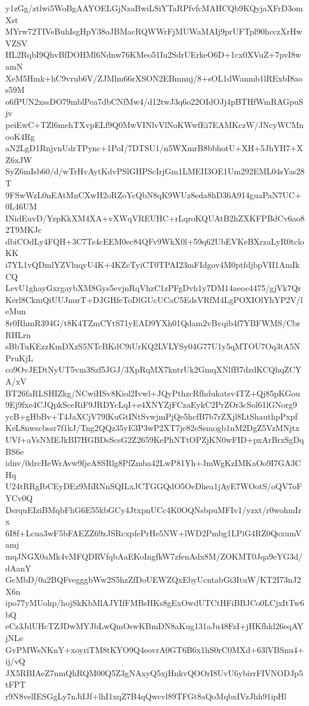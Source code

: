 y1zGg/ztlwi5WoBgAAYOELGjNzaBwiLSiYTaRPfvfcMAHCQb9KQyjaXFrD3omXst
MYrw72TIVeBuhIsgHpY38oJBMacRQWWrFjMUWaMAIj9prUFTpl90hcczXrHwVZSV
HL2RqbI9QhvBfDOHMl6Ndnw76KMeo51Iu2SdrUErkeO6D+1cx0XVuZ+7pvI8wamN
XeM5Hmk+hC9vrub6V/ZJMlm66rXSON2EBmnnj/8+sOL1dWanmb1lRExbI8aos59M
o6fPUN2xssDO79mblPea7dbCNfMw4/d12twJ3q6o22OIdOJj4pBTHfWmRAGpuSjv
peiEwC+TZl6mehTXvpELf9Q0MwVINlvVlNoKWwfEi7EAMKczW/JNcyWCMnooK4Rg
aN2LgD1RnjvnUdrTPync+1PoI/7DTSU1/n5WXmrB8bbhotU+XH+5JhYH7+XZ6xJW
SyZ6mIsb60/d/wTrHvAytKdvPSlGHPScIrjGm1LMEII3OE1Um292EML04sYas28T
9FSwWzL0nEAtMnCXwH2oRZoYcQbN8qK9WUz8eda8hD36A914guaPaN7UC+0L46UM
INidEuvD/YzpKkXM4XA+vXWqVREUHC+rLqroKQUAtB2hZXKFPBdCv6ao82T9MKJc
dbiCOdLy4FQH+3C7Ts4cEEM0ec84QFv9WkX0l+59q62UbEVKeBXrzaLyR0tcloKK
i7YL1vQDmlYZVluqyU4K+4KZcTyiCT0TPAI23mFIdgov4M0ptfdjbpVII1AmIkCQ
LevU1ghayGxrgaybXM8Gys5evjnRqVhzC1zPFgDvh1y7DM14aeoe4475/gjVk7Qr
Kerl8CkmQiUUJnurT+DJGHfeToDlGUcUCaC5EdsVRfM4LgPOXIOlYhYP2V/leMun
8r0RhmR394G/t8K4TZmCYtS71yEAD9YXh01Qdam2vBvqib4f7YBFWMS/CbrRHLrn
sBbTuKEzzKmDXzS5NTcBKdC9iUrKQ2LVLYSy04G77U1y5qMTOU7Oq3tA5NPruKjL
co9OvJEDtNyUT5vm3Szf5JGJ/3XpRqMX7kntrUk2GmqXNlfB7dzdKCQhqZCYA/xV
BT26faRLSHIZkg/NCwiHSv8Kiol2Ivwl+JQyPthzcRfhdukatsv4TZ+Qj85pKGou
9Ej9fxe4CJQpkSceRiF9JRDYcLqI+e4XNYZjFCzaEykC2PrZOr3cSol61lGNorg9
ycB+gHbBv+T4JaXCjV79lKuGtINtSvwjmPjQe5hcfB7b7rZXjl8LtShauthpPxpf
KeL8nwscbssr7f1kJ/Tng2QQz35yE3P3wP2XT7je82eSsmogb1nM2DgZ5VzMNjtx
UVf+aVsNMEJkBI7HGBDsScsG2Z2659KePhNTtOPZjKN0wFID+pxArBrzSgDqBS6e
idnv/0drcHeWrAvw9fjeA8SRlg8PfZmba42LwP81Yh+JmWgKzIMKaOo9I7GA3CHq
U24tRRgIbCEyDEz9MiRNnSQILxJCTGGQdO5OeDhea1jAyE7WOotS/oQV7oFYCv0Q
DsrquEIziBMqbFhG6E55kbGCy4JtxpnUCc4K0OQNsbpuMFIv1/yzxt/r0wohmIrx
6I8f+Lcua3wF5bFAEZZ69zJSRcxpfePrHe5NW+lWD2Pmbg1LPiG4RZ0QsxumVamj
mqJNGX0aMk4vMFQDRVfqbAaEKoIngfkW7zfenAdx8M/ZOKMT0Jqa9eYG3d/dAanY
GcMbD/0a2BQFvegggbWw2S5hzZfDoUEWZQxEbyUcntabGi3ItuW/KT2I73nJ2X6n
ipo77yMUohp/hojSkKbMlAJYIfFMBsHKs8gExOwdUTCtHFiBBJCo0LCjxItTw6bQ
eCz3JdUHcTZJDwMYJbLwQmOswKBmDN8aKug131aJu48FzI+jHKfhkl26eqAYjNLe
GvPMWsNKnY+xoyriTM8tKYO9Q4eovrA0GT6B6x1hS0rC0MXd+63lVBSnu4+ij/vQ
JX5RBIAeZ7nmQhRQM00Q5Z3gNAxyQ5xjHnkvQOOrI8UvU6ybirrFIVNODJp5tFPT
r9N8velIESGgLy7nJiIJf+lhI1xqZ7B4qQwcvl89TFGt8aQoMqbxIVzJhh91ipHl

